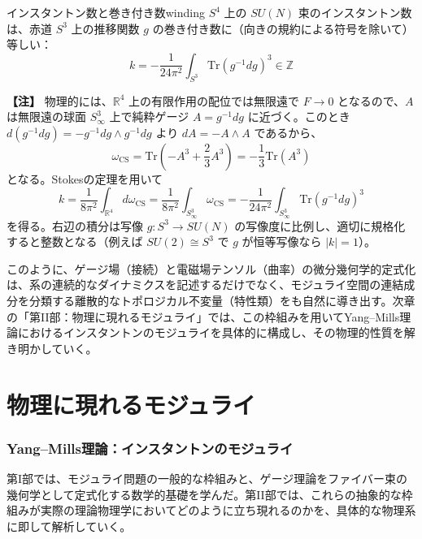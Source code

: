 \documentclass[uplatex, dvipdfmx, book]{jsbook}
\let\origsection\section
\let\origsubsection\subsection
\let\origsubsubsection\subsubsection
\newcommand{\chapter}{\origsection}
\renewcommand{\section}{\origsubsection}
\renewcommand{\subsection}{\origsubsubsection}
\renewcommand{\subsubsection}{\paragraph}
\newenvironment{note}{\vspace{1ex}\par\footnotesize\noindent\textbf{【注】}}{\par\vspace{1ex}}
\begin{document}
\begin{myprop}{インスタントン数と巻き付き数}{winding}
$S^4$ 上の $SU(N)$ 束のインスタントン数は、赤道 $S^3$ 上の推移関数 $g$ の巻き付き数に（向きの規約による符号を除いて）等しい：
\begin{equation*}
    k = -\frac{1}{24\pi^2}\int_{S^3} \mathrm{Tr}\left( g^{-1}dg \right)^3 \in \mathbb{Z}
\end{equation*}
\end{myprop}

\begin{note}
物理的には、$\mathbb{R}^4$ 上の有限作用の配位では無限遠で $F \to 0$ となるので、$A$ は無限遠の球面 $S^3_\infty$ 上で純粋ゲージ $A = g^{-1}dg$ に近づく。このとき $d(g^{-1}dg) = -g^{-1}dg \wedge g^{-1}dg$ より $dA = -A \wedge A$ であるから、
\begin{equation*}
    \omega_{\text{CS}} = \mathrm{Tr}\left( -A^3 + \frac{2}{3}A^3 \right) = -\frac{1}{3}\mathrm{Tr}(A^3)
\end{equation*}
となる。Stokesの定理を用いて
\begin{equation*}
    k = \frac{1}{8\pi^2}\int_{\mathbb{R}^4} d\omega_{\text{CS}} = \frac{1}{8\pi^2}\int_{S^3_\infty} \omega_{\text{CS}} = -\frac{1}{24\pi^2}\int_{S^3_\infty} \mathrm{Tr}\left(g^{-1}dg\right)^3
\end{equation*}
を得る。右辺の積分は写像 $g: S^3 \to SU(N)$ の写像度に比例し、適切に規格化すると整数となる（例えば $SU(2) \cong S^3$ で $g$ が恒等写像なら $|k| = 1$）。
\end{note}

このように、ゲージ場（接続）と電磁場テンソル（曲率）の微分幾何学的定式化は、系の連続的なダイナミクスを記述するだけでなく、モジュライ空間の連結成分を分類する離散的なトポロジカル不変量（特性類）をも自然に導き出す。次章の「第II部：物理に現れるモジュライ」では、この枠組みを用いてYang--Mills理論におけるインスタントンのモジュライを具体的に構成し、その物理的性質を解き明かしていく。
\part{物理に現れるモジュライ}

\chapter{Yang--Mills理論：インスタントンのモジュライ}
\label{ch:instanton}

第I部では、モジュライ問題の一般的な枠組みと、ゲージ理論をファイバー束の幾何学として定式化する数学的基礎を学んだ。第II部では、これらの抽象的な枠組みが実際の理論物理学においてどのように立ち現れるのかを、具体的な物理系に即して解析していく。
\end{document}
